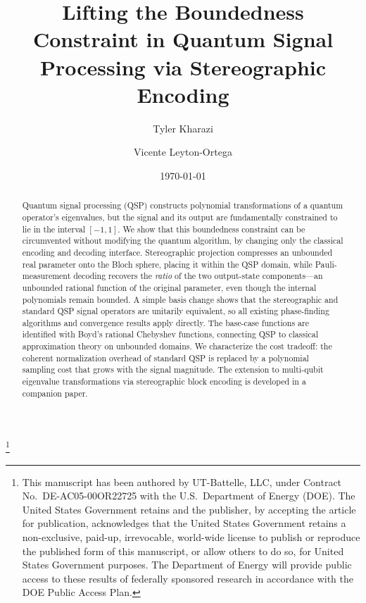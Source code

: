 \documentclass[
    reprint,
    amsmath,amssymb,
    aps,
    pra,  %
    superscriptaddress,
    floatfix
]{revtex4-2}
\theoremstyle{aps}
\begin{document}
\title{Lifting the Boundedness Constraint in Quantum Signal Processing via Stereographic Encoding}
\thanks{This manuscript has been authored by UT-Battelle, LLC, under Contract No.\ DE-AC05-00OR22725 with the U.S.\ Department of Energy (DOE). The United States Government retains and the publisher, by accepting the article for publication, acknowledges that the United States Government retains a non-exclusive, paid-up, irrevocable, world-wide license to publish or reproduce the published form of this manuscript, or allow others to do so, for United States Government purposes. The Department of Energy will provide public access to these results of federally sponsored research in accordance with the DOE Public Access Plan.}

\author{Tyler Kharazi}

\author{Vicente Leyton-Ortega}

\date{\today}

\begin{abstract}
	Quantum signal processing (QSP) constructs polynomial
	transformations of a quantum operator's eigenvalues, but the
	signal and its output are fundamentally constrained to lie in
	the interval $[-1,1]$.  We show that this boundedness
	constraint can be circumvented without modifying the quantum
	algorithm, by changing only the classical encoding and decoding
	interface.  Stereographic projection compresses an unbounded
	real parameter onto the Bloch sphere, placing it within the QSP
	domain, while Pauli-measurement decoding recovers the
	\emph{ratio} of the two output-state components---an unbounded
	rational function of the original parameter, even though the
	internal polynomials remain bounded.  A simple basis change
	shows that the stereographic and standard QSP signal operators
	are unitarily equivalent, so all existing phase-finding
	algorithms and convergence results apply directly.  The
	base-case functions are identified with Boyd's rational
	Chebyshev functions, connecting QSP to classical approximation
	theory on unbounded domains.  We characterize the cost
	tradeoff: the coherent normalization overhead of standard QSP
	is replaced by a polynomial sampling cost that grows with the
	signal magnitude.  The extension to multi-qubit eigenvalue
	transformations via stereographic block encoding is developed
	in a companion paper.
\end{abstract}
\end{document}
